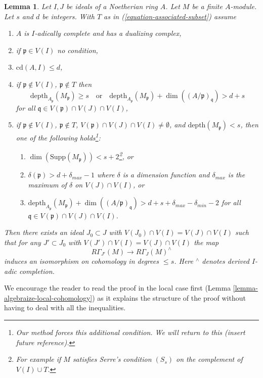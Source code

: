 \documentclass{stacks-project}
\theoremstyle{plain}
\newtheorem{lemma}[subsection]{Lemma}
\theoremstyle{definition}
\theoremstyle{remark}
\numberwithin{equation}{subsection}
\begin{document}
\begin{lemma}
\label{lemma-algebraize-local-cohomology-general}
Let $I, J$ be ideals of a Noetherian ring $A$.
Let $M$ be a finite $A$-module.
Let $s$ and $d$ be integers. With $T$ as in
(\ref{equation-associated-subset}) assume
\begin{enumerate}
\item $A$ is $I$-adically complete and has a dualizing complex,
\item if $\mathfrak p \in V(I)$ no condition,
\item $\text{cd}(A, I) \leq d$,
\item if $\mathfrak p \not \in V(I)$, $\mathfrak p \not \in T$ then
$$
\text{depth}_{A_\mathfrak p}(M_\mathfrak p) \geq s
\quad\text{or}\quad
\text{depth}_{A_\mathfrak p}(M_\mathfrak p) +
\dim((A/\mathfrak p)_\mathfrak q) > d + s
$$
for all $\mathfrak q \in V(\mathfrak p) \cap V(J) \cap V(I)$,
\item if $\mathfrak p \not \in V(I)$, $\mathfrak p \not \in T$,
$V(\mathfrak p) \cap V(J) \cap V(I) \not = \emptyset$, and
$\text{depth}(M_\mathfrak p) < s$, then one
of the following holds\footnote{Our method
forces this additional condition. We will return to this
(insert future reference).}:
\begin{enumerate}
\item $\dim(\text{Supp}(M_\mathfrak p)) < s + 2$\footnote{For example
if $M$ satisfies Serre's condition $(S_s)$
on the complement of $V(I) \cup T$.}, or
\item  $\delta(\mathfrak p) > d + \delta_{max} - 1$
where $\delta$ is a dimension function and $\delta_{max}$
is the maximum of $\delta$ on $V(J) \cap V(I)$, or
\item $\text{depth}_{A_\mathfrak p}(M_\mathfrak p) +
\dim((A/\mathfrak p)_\mathfrak q) > d + s + \delta_{max} - \delta_{min} - 2$
for all $\mathfrak q \in V(\mathfrak p) \cap V(J) \cap V(I)$.
\end{enumerate}
\end{enumerate}
Then there exists an ideal $J_0 \subset J$ with
$V(J_0) \cap V(I) = V(J) \cap V(I)$
such that for any $J' \subset J_0$ with
$V(J') \cap V(I) = V(J) \cap V(I)$ the map
$$
R\Gamma_{J'}(M) \longrightarrow R\Gamma_J(M)^\wedge
$$
induces an isomorphism on cohomology in degrees $\leq s$.
Here ${}^\wedge$ denotes derived $I$-adic completion.
\end{lemma}

\noindent
We encourage the reader to read the proof in the local case first
(Lemma \ref{lemma-algebraize-local-cohomology}) as it explains the structure
of the proof without having to deal with all the inequalities.
\end{document}
